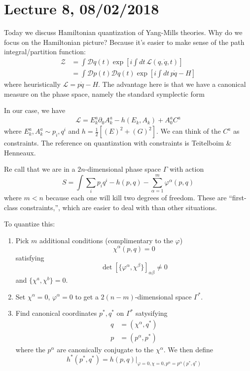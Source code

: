 \section*{Lecture 8, 08/02/2018}
Today we discuss Hamiltonian quantization of Yang-Mills theories.
Why do we focus on the Hamiltonian picture?
Because it's easier to make sense of the path integral/partition function:
\begin{align*}
\mathcal Z &= \int \mathcal D q(t) \exp \left[i \int dt\, \mathcal{L}(q, \dot q, t)\right]\\
&= \int \mathcal D p(t) \mathcal D q(t) \exp \left[ i\int dt\, p\dot q- H \right]
\end{align*}
where heuristically $\mathcal L = p \dot q - H.$
The advantage here is that we have a canonical measure on the phase space, namely the standard symplectic form 

In our case, we have
\begin{align*}
\mathcal L = E_k^a \partial_0 A_k^a - h(E_k , A_k) + A_0^a C^a
\end{align*}
where $E_k^a, A_k^a \sim p_i, q^i$ and $h = \frac{1}{2} [(E)^2 + (G)^2]$.
We can think of the $C^a$ as constraints.
The reference on quantization with constraints is Teitelboim \& Henneaux.

Re call that we are in a $2n$-dimensional phase space $\Gamma$ with action
\[
S = \int \sum_i p_i q^i - h(p,q) - \sum_{\alpha = 1}^m \varphi^\alpha(p,q)
\]
where $m < n$ because each one will kill two degrees of freedom.
These are ``first-class constraints,'', which are easier to deal with than other situations.

To quantize this: 
\begin{enumerate}
    \item Pick $m$ additional conditions (complimentary to the $\varphi$)
    \[
    \chi^\alpha(p,q) = 0
    \]
    satisfying
    \[
    \det [ \{ \varphi^\alpha, \chi^\beta\}]_{\alpha \beta} \ne 0
    \]
    and $\{\chi^a, \chi^b\} = 0.$
    \item Set $\chi^\alpha = 0$, $\varphi^\alpha = 0$ to get a $2(n-m)$-dimensional space $\Gamma^*$.
    \item Find canonical coordinates $p^*, q^*$ on $\Gamma^*$ satysifying
    \begin{align*}
    q &= (\chi^\alpha, q^*)\\
    p &= (p^\alpha, p^*)
    \end{align*}
    where the $p^\alpha$ are canonically conjugate to the $\chi^\alpha$.
    We then define
    \[
    h^*(p^*,q^*) = h(p,q)|_{\varphi = 0, \chi = 0, p^\alpha = p^\alpha(p^*,q^*)}
    \]
\end{enumerate}

